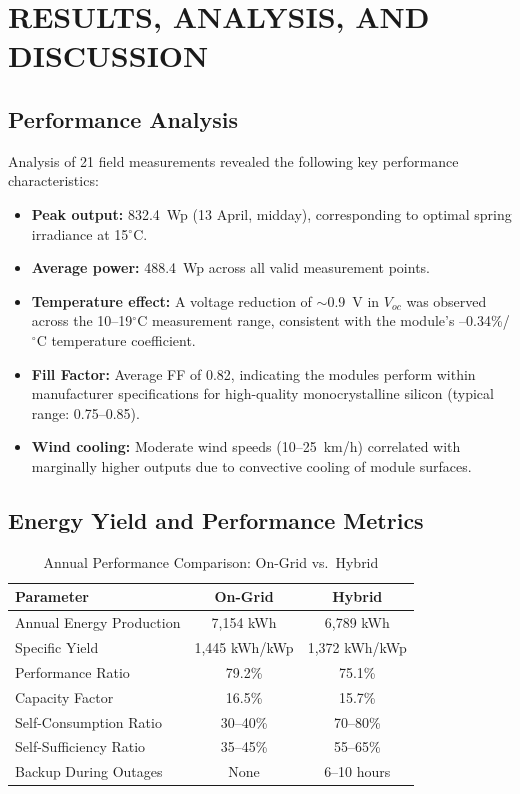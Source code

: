 \chapter{RESULTS, ANALYSIS, AND DISCUSSION}

\section{Performance Analysis}

Analysis of 21 field measurements revealed the following key performance characteristics:

\begin{itemize}
    \item \textbf{Peak output:} 832.4~Wp (13 April, midday), corresponding to optimal spring irradiance at 15$^{\circ}$C.
    \item \textbf{Average power:} 488.4~Wp across all valid measurement points.
    \item \textbf{Temperature effect:} A voltage reduction of $\sim$0.9~V in $V_{oc}$ was observed across the 10--19$^{\circ}$C measurement range, consistent with the module's --0.34\%/$^{\circ}$C temperature coefficient.
    \item \textbf{Fill Factor:} Average FF of 0.82, indicating the modules perform within manufacturer specifications for high-quality monocrystalline silicon (typical range: 0.75--0.85).
    \item \textbf{Wind cooling:} Moderate wind speeds (10--25~km/h) correlated with marginally higher outputs due to convective cooling of module surfaces.
\end{itemize}


\section{Energy Yield and Performance Metrics}

\begin{table}[H]
\centering
\caption{Annual Performance Comparison: On-Grid vs.\ Hybrid}
\label{tab:short_performance}
\begin{tabular}{@{}p{5.5cm} c c@{}}
\toprule
\textbf{Parameter} & \textbf{On-Grid} & \textbf{Hybrid} \\
\midrule
Annual Energy Production & 7,154 kWh & 6,789 kWh \\
Specific Yield & 1,445 kWh/kWp & 1,372 kWh/kWp \\
Performance Ratio & 79.2\% & 75.1\% \\
Capacity Factor & 16.5\% & 15.7\% \\
Self-Consumption Ratio & 30--40\% & 70--80\% \\
Self-Sufficiency Ratio & 35--45\% & 55--65\% \\
Backup During Outages & None & 6--10 hours \\
\bottomrule
\end{tabular}
\end{table}

